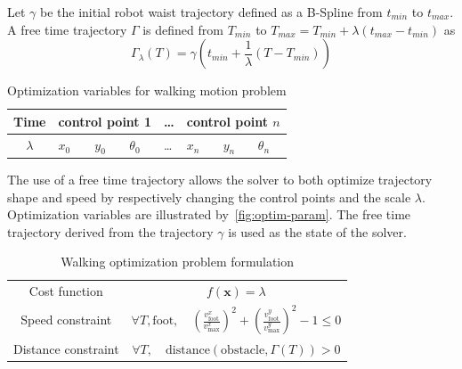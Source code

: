 \documentclass[conference,final,a4paper,twocolumn,9pt]{IEEEtran}
\begin{document}
Let $\gamma$ be the initial robot waist trajectory defined as a
B-Spline from $t_{min}$ to $t_{max}$. A free time trajectory $\Gamma$
is defined from $T_{min}$ to \linebreak $T_{max} = T_{min} + \lambda
(t_{max} - t_{min})$ as
\begin{equation}
  \Gamma_{\lambda} (T) = \gamma (t_{min} + \frac{1}{\lambda} (T -
  T_{min}))
\end{equation}

\begin{table}[ht!]
  \begin{center}
    \begin{tabular}{|c|l l l| l |l l l|}
      \hline
      Time
      & \multicolumn{3}{|c|}{control point 1}
      & \ldots
      & \multicolumn{3}{|c|}{control point $n$}\\
      \hline
      $\lambda$
      & $x_0$ & $y_0$ & $\theta_0$
      & \ldots
      & $x_n$ & $y_n$ & $\theta_n$\\
      \hline
    \end{tabular}
  \end{center}
  \caption{Optimization variables for walking motion problem\label{fig:optim-param}}
\end{table}


The use of a free time trajectory allows the solver to both optimize
trajectory shape and speed by respectively changing the control points
and the scale $\lambda$. Optimization variables are illustrated
by~\autoref{fig:optim-param}. The free time trajectory derived from
the trajectory $\gamma$ is used as the state of the solver.


\begin{table}[ht!]
  \begin{center}
    \begin{tabular}{|c|c|}
      \hline Cost function & $f(\mathbf{x}) = \lambda$\\ Speed
      constraint & $\forall T, \text{foot},\quad
      (\frac{v_{\text{foot}}^{x}}{v_{\text{max}}^{x}})^2 +
      (\frac{v_{\text{foot}}^{y}}{v_{\text{max}}^{y}})^2 - 1 \leq
      0$\\ Distance constraint & $\forall T,\quad\text{distance} (\text{obstacle},
      \Gamma (T)) > 0$\\ \hline
    \end{tabular}
    \caption{Walking optimization problem formulation\label{fig:pb-walking}}
  \end{center}
\end{table}
\end{document}
